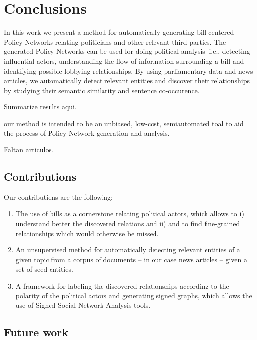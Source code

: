 \section{Conclusions}\label{sec:conclusions}

In this work we present a method for automatically generating bill-centered Policy Networks relating politicians and other relevant third parties. The generated Policy Networks can be used for doing political analysis, i.e., detecting influential actors, understanding the flow of information surrounding a bill and identifying possible lobbying relationships. By using parliamentary data and news articles, we automatically detect relevant entities and discover their relationships by studying their semantic similarity and sentence co-occurence. 

Summarize results aqui.

our method is intended to be an unbiased, low-cost, semiautomated toal to aid the process of Policy Network generation and analysis. 

Faltan articulos.

\subsection{Contributions}\label{subsec:conclusions_contributions}

Our contributions are the following:

\begin{enumerate}
\item The use of bills as a cornerstone relating political actors, which allows to i) understand better the discovered relations and ii) and to find fine-grained relationships which would otherwise be missed.
\item An unsupervised method for automatically detecting relevant entities of a given topic from a corpus of documents -- in our case news articles -- given a set of seed entities. 
\item A framework for labeling the discovered relationships according to the polarity of the political actors and generating signed graphs, which allows the use of Signed Social Network Analysis tools.
\end{enumerate}

\subsection{Future work}\label{subsec:conclusions_futurework}

